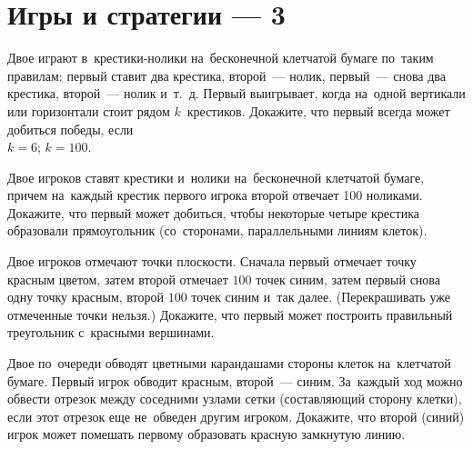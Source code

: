 
\section*{Игры и стратегии --- 3}


\begin{problems}

\item
Двое играют в~крестики-нолики на~бесконечной клетчатой бумаге по~таким
правилам: первый ставит два крестика, второй~--- нолик, первый~--- снова два
крестика, второй~--- нолик и~т.~д.
Первый выигрывает, когда на~одной вертикали или горизонтали стоит рядом
$k$~крестиков.
Докажите, что первый всегда может добиться победы, если
\\
\subproblem $k = 6$;
\qquad
\subproblem $k = 100$.

\item
Двое игроков ставят крестики и~нолики на~бесконечной клетчатой бумаге, причем
на~каждый крестик первого игрока второй отвечает 100 ноликами.
Докажите, что первый может добиться, чтобы некоторые четыре крестика образовали
прямоугольник (со~сторонами, параллельными линиям клеток).

\item
Двое игроков отмечают точки плоскости.
Сначала первый отмечает точку красным цветом, затем второй отмечает $100$ точек
синим, затем первый снова одну точку красным, второй $100$ точек синим и~так
далее.
(Перекрашивать уже отмеченные точки нельзя.)
Докажите, что первый может построить правильный треугольник с~красными
вершинами.

\item
Двое по~очереди обводят цветными карандашами стороны клеток на~клетчатой
бумаге.
Первый игрок обводит красным, второй~--- синим.
За~каждый ход можно обвести отрезок между соседними узлами сетки
(составляющий сторону клетки), если этот отрезок еще не~обведен другим игроком.
Докажите, что второй (синий) игрок может помешать первому образовать
красную замкнутую линию.

\end{problems}


